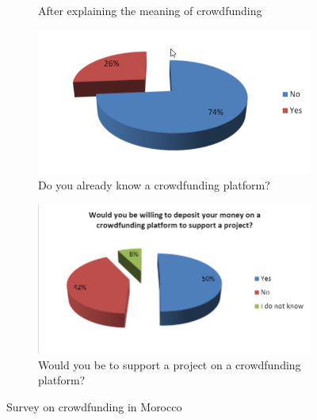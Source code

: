 \begin{figure}
\begin{subfigure}[b]{0.45\textwidth}
          \caption{After explaining the meaning of crowdfunding}
          \label{fig:knowCrowd}
      \end{subfigure}
      \hfill
      \begin{subfigure}[b]{0.45\textwidth}
          \centering
          \includegraphics[width=\textwidth]{assets/knowPlatform.png}
          \caption{Do you already know a crowdfunding platform?}
          \label{fig:knowPlatform}
      \end{subfigure}
      \hfill
      \begin{subfigure}[b]{0.45\textwidth}
          \centering
          \includegraphics[width=\textwidth]{assets/willing.png}
          \caption{Would you be to support a project on a crowdfunding platform?}
          \label{fig:willing}
      \end{subfigure}
      
      \caption{Survey on crowdfunding in Morocco}
      \label{fig:survey}
\end{figure}





